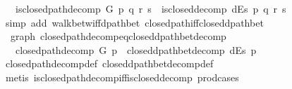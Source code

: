 \begin{isabellebody}
\ \ \ {\isachardoublequoteopen}is{\isacharunderscore}{\kern0pt}closed{\isacharunderscore}{\kern0pt}path{\isacharunderscore}{\kern0pt}decomp\ G\ p\ {\isacharparenleft}{\kern0pt}q{\isacharcomma}{\kern0pt}\ r{\isacharcomma}{\kern0pt}\ s{\isacharparenright}{\kern0pt}\ {\isasymlongleftrightarrow}\ is{\isacharunderscore}{\kern0pt}closed{\isacharunderscore}{\kern0pt}decomp\ dEs\ p\ {\isacharparenleft}{\kern0pt}q{\isacharcomma}{\kern0pt}\ r{\isacharcomma}{\kern0pt}\ s{\isacharparenright}{\kern0pt}{\isachardoublequoteclose}%
\endisataginvisible
{\isafoldinvisible}%
%
\isadeliminvisible
\isanewline
%
\endisadeliminvisible
%
\isadelimproof
\ \ %
\endisadelimproof
%
\isatagproof
{}\isamarkupfalse%
\ {\isacharparenleft}{\kern0pt}simp\ add{\isacharcolon}{\kern0pt}\ walk{\isacharunderscore}{\kern0pt}betw{\isacharunderscore}{\kern0pt}iff{\isacharunderscore}{\kern0pt}dpath{\isacharunderscore}{\kern0pt}bet\ closed{\isacharunderscore}{\kern0pt}path{\isacharunderscore}{\kern0pt}iff{\isacharunderscore}{\kern0pt}closed{\isacharunderscore}{\kern0pt}dpath{\isacharunderscore}{\kern0pt}bet{\isacharparenright}{\kern0pt}%
\endisatagproof
{\isafoldproof}%
%
\isadelimproof
\isanewline
%
\endisadelimproof
%
\isadeliminvisible
\isanewline
%
\endisadeliminvisible
%
\isataginvisible
{}\isamarkupfalse%
\ {\isacharparenleft}{\kern0pt}\ graph{\isacharparenright}{\kern0pt}\ closed{\isacharunderscore}{\kern0pt}path{\isacharunderscore}{\kern0pt}decomp{\isacharunderscore}{\kern0pt}eq{\isacharunderscore}{\kern0pt}closed{\isacharunderscore}{\kern0pt}dpath{\isacharunderscore}{\kern0pt}bet{\isacharunderscore}{\kern0pt}decomp{\isacharcolon}{\kern0pt}\isanewline
\ \ \ {\isachardoublequoteopen}closed{\isacharunderscore}{\kern0pt}path{\isacharunderscore}{\kern0pt}decomp\ G\ p\ {\isacharequal}{\kern0pt}\ closed{\isacharunderscore}{\kern0pt}dpath{\isacharunderscore}{\kern0pt}bet{\isacharunderscore}{\kern0pt}decomp\ dEs\ p{\isachardoublequoteclose}%
\endisataginvisible
{\isafoldinvisible}%
%
\isadeliminvisible
\isanewline
%
\endisadeliminvisible
%
\isadelimproof
\ \ %
\endisadelimproof
%
\isatagproof
{}\isamarkupfalse%
\ closed{\isacharunderscore}{\kern0pt}path{\isacharunderscore}{\kern0pt}decomp{\isacharunderscore}{\kern0pt}def\ closed{\isacharunderscore}{\kern0pt}dpath{\isacharunderscore}{\kern0pt}bet{\isacharunderscore}{\kern0pt}decomp{\isacharunderscore}{\kern0pt}def\isanewline
\ \ \isamarkupfalse%
\ {\isacharparenleft}{\kern0pt}metis\ is{\isacharunderscore}{\kern0pt}closed{\isacharunderscore}{\kern0pt}path{\isacharunderscore}{\kern0pt}decomp{\isacharunderscore}{\kern0pt}iff{\isacharunderscore}{\kern0pt}is{\isacharunderscore}{\kern0pt}closed{\isacharunderscore}{\kern0pt}decomp\ prod{\isacharunderscore}{\kern0pt}cases{}{\isacharparenright}{\kern0pt}%

\end{isabellebody}
